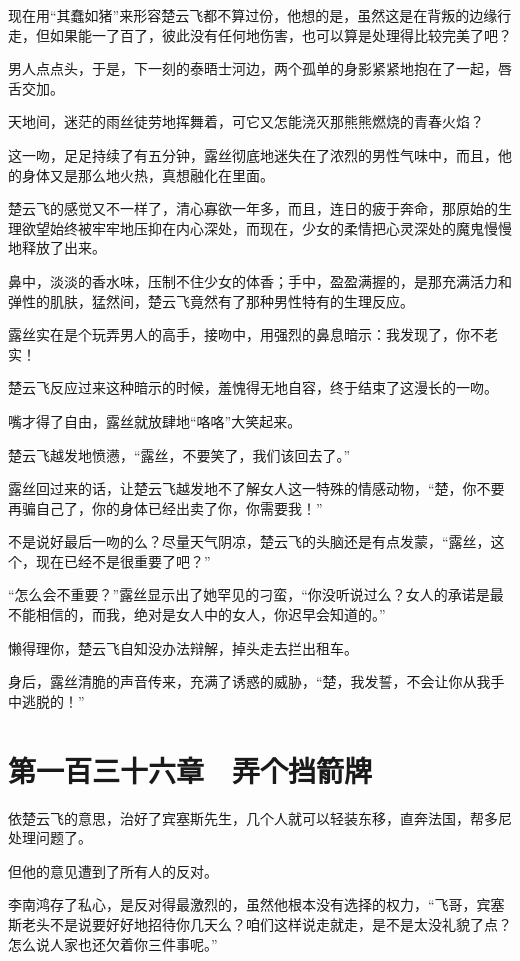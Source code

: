 现在用“其蠢如猪”来形容楚云飞都不算过份，他想的是，虽然这是在背叛的边缘行走，但如果能一了百了，彼此没有任何地伤害，也可以算是处理得比较完美了吧？

男人点点头，于是，下一刻的泰晤士河边，两个孤单的身影紧紧地抱在了一起，唇舌交加。

天地间，迷茫的雨丝徒劳地挥舞着，可它又怎能浇灭那熊熊燃烧的青春火焰？

这一吻，足足持续了有五分钟，露丝彻底地迷失在了浓烈的男性气味中，而且，他的身体又是那么地火热，真想融化在里面。

楚云飞的感觉又不一样了，清心寡欲一年多，而且，连日的疲于奔命，那原始的生理欲望始终被牢牢地压抑在内心深处，而现在，少女的柔情把心灵深处的魔鬼慢慢地释放了出来。

鼻中，淡淡的香水味，压制不住少女的体香；手中，盈盈满握的，是那充满活力和弹性的肌肤，猛然间，楚云飞竟然有了那种男性特有的生理反应。

露丝实在是个玩弄男人的高手，接吻中，用强烈的鼻息暗示：我发现了，你不老实！

楚云飞反应过来这种暗示的时候，羞愧得无地自容，终于结束了这漫长的一吻。

嘴才得了自由，露丝就放肆地“咯咯”大笑起来。

楚云飞越发地愤懑，“露丝，不要笑了，我们该回去了。”

露丝回过来的话，让楚云飞越发地不了解女人这一特殊的情感动物，“楚，你不要再骗自己了，你的身体已经出卖了你，你需要我！”

不是说好最后一吻的么？尽量天气阴凉，楚云飞的头脑还是有点发蒙，“露丝，这个，现在已经不是很重要了吧？”

“怎么会不重要？”露丝显示出了她罕见的刁蛮，“你没听说过么？女人的承诺是最不能相信的，而我，绝对是女人中的女人，你迟早会知道的。”

懒得理你，楚云飞自知没办法辩解，掉头走去拦出租车。

身后，露丝清脆的声音传来，充满了诱惑的威胁，“楚，我发誓，不会让你从我手中逃脱的！”

\section{第一百三十六章　弄个挡箭牌}

依楚云飞的意思，治好了宾塞斯先生，几个人就可以轻装东移，直奔法国，帮多尼处理问题了。

但他的意见遭到了所有人的反对。

李南鸿存了私心，是反对得最激烈的，虽然他根本没有选择的权力，“飞哥，宾塞斯老头不是说要好好地招待你几天么？咱们这样说走就走，是不是太没礼貌了点？怎么说人家也还欠着你三件事呢。”

